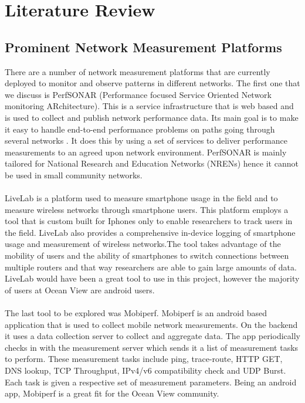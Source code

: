 \section{Literature Review}
\subsection{Prominent Network Measurement Platforms}
There are a number of network measurement platforms that are currently deployed to monitor and observe patterns in different networks. The first one that we discuss is PerfSONAR (Performance focused Service Oriented Network monitoring ARchitecture)\cite{10.1007/11596141_19}. This is a service infrastructure that is web based and is used to collect and publish network performance data\cite{article2}. Its main goal is to make it easy to handle end-to-end performance problems on paths going through several networks \cite{article2}. It does this by using a set of services to deliver performance measurements to an agreed upon network environment. PerfSONAR is mainly tailored for National Research and Education Networks (NRENs) hence it cannot be used in small community networks.

\paragraph{}
LiveLab is a platform used to measure smartphone usage in the field and to measure wireless networks through smartphone users\cite{article3}. This platform employs a tool that is custom built for Iphones only to enable researchers to track users in the field. LiveLab also provides a comprehensive in-device logging of smartphone usage and measurement of wireless networks\cite{article3}.The tool takes advantage of the mobility
of users and the ability of smartphones to switch connections between multiple routers and that way researchers are able to gain large amounts of data\cite{article3}. LiveLab would have been a great tool to use in this project, however the majority of users at Ocean View are android users.
\paragraph{}
The last tool to be explored was Mobiperf. Mobiperf is an android based application that is used to collect mobile network measurements. On the backend it uses a data collection server to collect and aggregate data. The app periodically checks in with the measurement server which sends it a list of measurement tasks to perform. These measurement tasks include ping, trace-route, HTTP GET, DNS lookup, TCP Throughput, IPv4/v6 compatibility check and UDP Burst. Each task is given a respective set of measurement parameters\cite{articleJunxian}. Being an android app, Mobiperf is a great fit for the Ocean View community.
